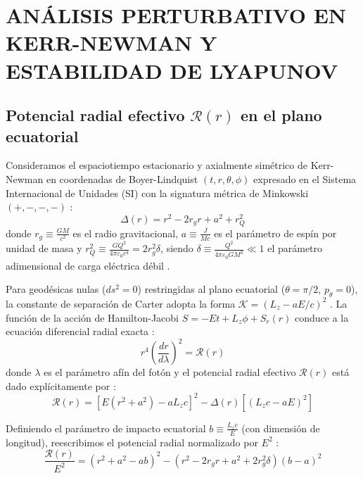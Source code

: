 \chapter{ANÁLISIS PERTURBATIVO EN KERR-NEWMAN Y ESTABILIDAD DE LYAPUNOV}

\section{Potencial radial efectivo \texorpdfstring{$\mathcal{R}(r)$}{R(r)} en el plano ecuatorial}
Consideramos el espaciotiempo estacionario y axialmente simétrico de Kerr-Newman en coordenadas de Boyer-Lindquist $(t, r, \theta, \phi)$ expresado en el Sistema Internacional de Unidades (SI) con la signatura métrica de Minkowski $(+,-,-,-)$ \citep{Carroll, Hobson}:
\begin{equation}
    \Delta(r) = r^2 - 2 r_g r + a^2 + r_Q^2
    \label{eq:delta_KN_SI}
\end{equation}
donde $r_g \equiv \frac{GM}{c^2}$ es el radio gravitacional, $a \equiv \frac{J}{Mc}$ es el parámetro de espín por unidad de masa y $r_Q^2 \equiv \frac{G Q^2}{4\pi\varepsilon_0 c^4} = 2 r_g^2 \delta$, siendo $\delta \equiv \frac{Q^2}{4\pi\varepsilon_0 G M^2} \ll 1$ el parámetro adimensional de carga eléctrica débil \citep{prueba_bh_cargado}.

Para geodésicas nulas ($ds^2 = 0$) restringidas al plano ecuatorial ($\theta = \pi/2$, $p_\theta = 0$), la constante de separación de Carter adopta la forma $\mathcal{K} = (L_z - a E/c)^2$ \citep{Chandrasekhar, 1403.5234v2}. La función de la acción de Hamilton-Jacobi $S = -E t + L_z \phi + S_r(r)$ conduce a la ecuación diferencial radial exacta \citep{Carroll, Hobson}:
\begin{equation}
    r^4 \left( \frac{dr}{d\lambda} \right)^2 = \mathcal{R}(r)
    \label{eq:partida_KN_R}
\end{equation}
donde $\lambda$ es el parámetro afín del fotón y el potencial radial efectivo $\mathcal{R}(r)$ está dado explícitamente por \citep{Chandrasekhar, 1403.5234v2}:
\begin{equation}
    \mathcal{R}(r) = \left[ E (r^2 + a^2) - a L_z c \right]^2 - \Delta(r) \left[ (L_z c - a E)^2 \right]
    \label{eq:potencial_carter_KN}
\end{equation}

Definiendo el parámetro de impacto ecuatorial $b \equiv \frac{L_z c}{E}$ (con dimensión de longitud), reescribimos el potencial radial normalizado por $E^2$ \citep{Sneppen, chaos_fractals_photon_ring}:
\begin{equation}
    \frac{\mathcal{R}(r)}{E^2} = \left( r^2 + a^2 - a b \right)^2 - \left( r^2 - 2 r_g r + a^2 + 2 r_g^2 \delta \right) (b - a)^2
    \label{eq:potencial_R_parametro_b}
\end{equation}

